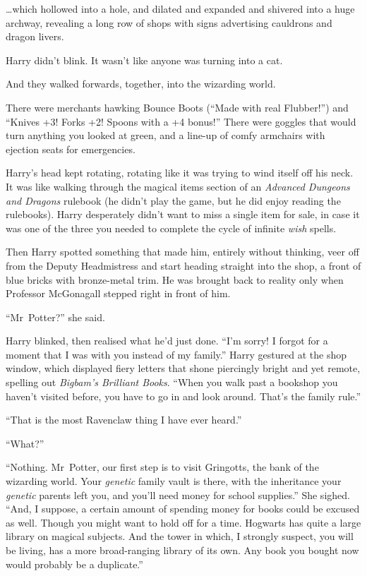 …which hollowed into a hole, and dilated and expanded and shivered into a huge archway, revealing a long row of shops with signs advertising cauldrons and dragon livers.

Harry didn’t blink. It wasn’t like anyone was turning into a cat.

And they walked forwards, together, into the wizarding world.

There were merchants hawking Bounce Boots (“Made with real Flubber!”) and “Knives +3! Forks +2! Spoons with a +4 bonus!” There were goggles that would turn anything you looked at green, and a line-up of comfy armchairs with ejection seats for emergencies.

Harry’s head kept rotating, rotating like it was trying to wind itself off his neck. It was like walking through the magical items section of an \emph{Advanced Dungeons and Dragons} rulebook (he didn’t play the game, but he did enjoy reading the rulebooks). Harry desperately didn’t want to miss a single item for sale, in case it was one of the three you needed to complete the cycle of infinite \emph{wish} spells.

Then Harry spotted something that made him, entirely without thinking, veer off from the Deputy Headmistress and start heading straight into the shop, a front of blue bricks with bronze-metal trim. He was brought back to reality only when Professor McGonagall stepped right in front of him.

“Mr~Potter?” she said.

Harry blinked, then realised what he’d just done. “I’m sorry! I forgot for a moment that I was with you instead of my family.” Harry gestured at the shop window, which displayed fiery letters that shone piercingly bright and yet remote, spelling out \emph{Bigbam’s Brilliant Books}. “When you walk past a bookshop you haven’t visited before, you have to go in and look around. That’s the family rule.”

“That is the most Ravenclaw thing I have ever heard.”

“What?”

“Nothing. Mr~Potter, our first step is to visit Gringotts, the bank of the wizarding world. Your \emph{genetic} family vault is there, with the inheritance your \emph{genetic} parents left you, and you’ll need money for school supplies.” She sighed. “And, I suppose, a certain amount of spending money for books could be excused as well. Though you might want to hold off for a time. Hogwarts has quite a large library on magical subjects. And the tower in which, I strongly suspect, you will be living, has a more broad-ranging library of its own. Any book you bought now would probably be a duplicate.”

